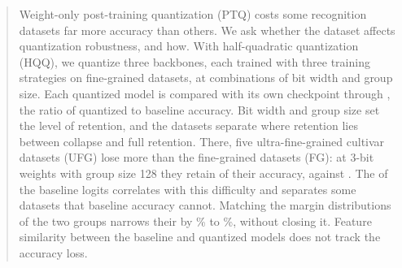 \begin{abstract}
Weight-only post-training quantization (PTQ) costs some recognition datasets far more accuracy than others.
We ask whether the dataset affects quantization robustness, and how.
With half-quadratic quantization (HQQ), we quantize three backbones, each trained with three training strategies on  fine-grained datasets, at  combinations of bit width and group size.
Each quantized model is compared with its own checkpoint through , the ratio of quantized to baseline accuracy.
Bit width and group size set the level of retention, and the datasets separate where retention lies between collapse and full retention.
There, five ultra-fine-grained cultivar datasets (UFG) lose more than the  fine-grained datasets (FG): at 3-bit weights with group size 128 they retain  of their accuracy, against .
The  of the baseline logits correlates with this difficulty and separates some datasets that baseline accuracy cannot.
Matching the margin distributions of the two groups narrows their  by \% to \%, without closing it.
Feature similarity between the baseline and quantized models does not track the accuracy loss.
\end{abstract}
